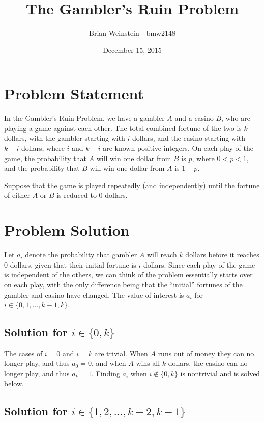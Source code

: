 \documentclass[a4paper,11pt]{article}
\title{The Gambler's Ruin Problem}
\author{Brian Weinstein - bmw2148}
\affil{Probability \& Statistics  (STAT-W4700), Columbia University, Fall 2015}
\date{December 15, 2015}
\begin{document}
\maketitle
\doublespacing



\section{Problem Statement}

In the Gambler's Ruin Problem, we have a gambler $A$ and a casino $B$, who are playing a game against each other. The total combined fortune of the two is $k$ dollars, with the gambler starting with $i$ dollars, and the casino starting with $k-i$ dollars, where $i$ and $k-i$ are known positive integers. On each play of the game, the probability that $A$ will win one dollar from $B$ is $p$, where $0<p<1$, and the probability that $B$ will win one dollar from $A$ is $1-p$.

Suppose that the game is played repeatedly (and independently) until the fortune of either $A$ or $B$ is reduced to 0 dollars.



\section{Problem Solution}
Let $a_i$ denote the probability that gambler $A$ will reach $k$ dollars before it reaches 0 dollars, given that their initial fortune is $i$ dollars. Since each play of the game is independent of the others, we can think of the problem essentially starts over on each play, with the only difference being that the ``initial'' fortunes of the gambler and casino have changed. The value of interest is $a_i$ for $i\in\{0,1,\ldots,k-1,k\}$.

\subsection{Solution for $i \in \{0,k\}$}

The cases of $i=0$ and $i=k$ are trivial. When $A$ runs out of money they can no longer play, and thus $a_0=0$, and when $A$ wins all $k$ dollars, the casino can no longer play, and thus $a_k=1$. Finding $a_i$ when $i\not\in\{0,k\}$ is nontrivial and is solved below.

\subsection{Solution for $i \in \{1,2,\ldots,k-2,k-1\}$}
\end{document}
